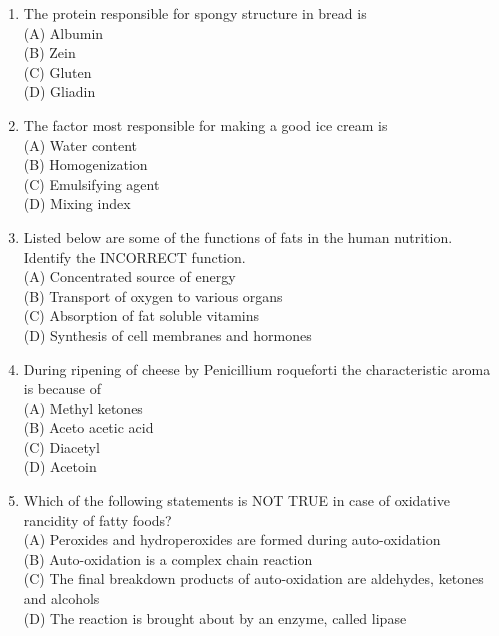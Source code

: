 \documentclass[journal,12pt,onecolumn]{IEEEtran}
\begin{document}
\begin{enumerate}

\item The protein responsible for spongy structure in bread is
\vspace{0.2cm}
\hfill{} \\
(A) Albumin \\
(B) Zein \\
(C) Gluten \\
(D) Gliadin
\vspace{0.5cm}

\item The factor most responsible for making a good ice cream is
\vspace{0.2cm}
\hfill{} \\
(A) Water content \\
(B) Homogenization \\
(C) Emulsifying agent \\
(D) Mixing index
\vspace{0.5cm}

\item Listed below are some of the functions of fats in the human nutrition. Identify the INCORRECT function.
\vspace{0.2cm}
\hfill{} \\
(A) Concentrated source of energy \\
(B) Transport of oxygen to various organs \\
(C) Absorption of fat soluble vitamins \\
(D) Synthesis of cell membranes and hormones
\vspace{0.5cm}

\item During ripening of cheese by Penicillium roqueforti the characteristic aroma is because of
\vspace{0.2cm}
\hfill{} \\
(A) Methyl ketones \\
(B) Aceto acetic acid \\
(C) Diacetyl \\
(D) Acetoin
\vspace{0.5cm}

\item Which of the following statements is NOT TRUE in case of oxidative rancidity of fatty foods?
\vspace{0.2cm}
\hfill{} \\
(A) Peroxides and hydroperoxides are formed during auto-oxidation \\
(B) Auto-oxidation is a complex chain reaction \\
(C) The final breakdown products of auto-oxidation are aldehydes, ketones and alcohols \\
(D) The reaction is brought about by an enzyme, called lipase
\vspace{0.5cm}


\end{enumerate}
\end{document}
